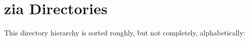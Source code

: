 \section{zia Directories}
This directory hierarchy is sorted roughly, but not completely, alphabetically:\begin{CompactList}
\item {}
\begin{CompactList}
\item {}
\end{CompactList}
\end{CompactList}
